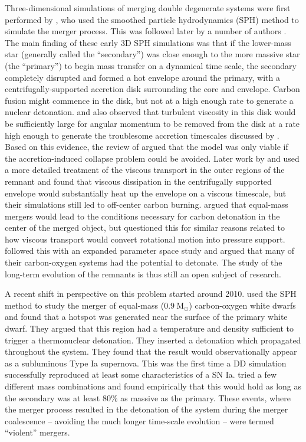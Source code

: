 \documentclass[iop]{emulateapj}
\newcommand{\msolar}{\mathrm{M}_\odot}
\begin{document}
Three-dimensional simulations of merging double degenerate systems were 
first performed by \citet{benz:1990}, who used the smoothed particle
hydrodynamics (SPH) method to simulate the merger process. This was 
followed later by a number of authors 
\citep{rasio_shapiro:1995,segretain:1997,guerrero:2004,yoon:2007,loren-aguilar:2009,raskin:2012}.
The main finding of these early 3D SPH simulations was that if the 
lower-mass star (generally called the ``secondary'') was
close enough to the more massive star (the ``primary'') to begin mass
transfer on a dynamical time scale, the secondary completely disrupted
and formed a hot envelope around the primary, with a
centrifugally-supported accretion disk surrounding the core and
envelope. Carbon fusion might commence in the disk, but not at a 
high enough rate to generate a nuclear detonation. \cite{mochkovitch_livio:1990} 
and \cite{livio:2000}  also observed that turbulent viscosity in this disk 
would be sufficiently large for angular momentum to be removed from the 
disk at a rate high enough to generate the troublesome accretion 
timescales discussed by \cite{tutukov_yungelson:1979}. Based on this
evidence, the review of \cite{hillebrandtniemeyer2000} argued that the
model was only viable if the accretion-induced collapse problem could
be avoided. Later work by \cite{shen:2012} and \cite{schwab:2012} used
a more detailed treatment of the viscous transport in the outer
regions of the remnant and found that viscous dissipation in the centrifugally
supported envelope would substantially heat up the envelope on a  
viscous timescale, but their simulations still led to off-center carbon
burning. \cite{vankerkwijk:2010} argued that equal-mass mergers would
lead to the conditions necessary for carbon detonation in the center
of the merged object, but \cite{shen:2012} questioned this for similar
reasons related to how viscous transport would convert rotational
motion into pressure support. \cite{zhu:2013} followed this with an
expanded parameter space study and argued that many of their
carbon-oxygen systems had the potential to detonate. The study of the
long-term evolution of the remnants is thus still an open subject of
research.

A recent shift in perspective on this problem started around 2010.
\cite{pakmor:2010} used the SPH method to study the merger of 
equal-mass ($0.9\ \msolar$) carbon-oxygen white dwarfs and found 
that a hotspot was generated near the surface of the primary 
white dwarf. They argued that this region had a temperature 
and density sufficient to trigger a thermonuclear
detonation. They inserted a detonation which propagated throughout 
the system. They found that the result would observationally 
appear as a subluminous Type Ia supernova. This was the first time 
a DD simulation successfully reproduced at least some characteristics of a SN
Ia. \cite{pakmor:2011} tried a few different mass combinations and
found empirically that this would hold as long as the secondary was at
least 80\% as massive as the primary. These events, where the merger
process resulted in the detonation of the system during the merger
coalescence -- avoiding the much longer time-scale evolution -- were
termed ``violent'' mergers.
\end{document}
